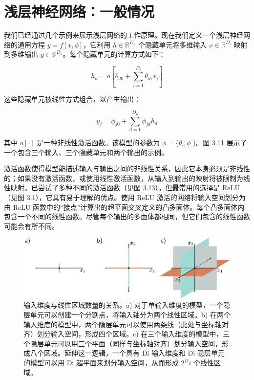 \section{浅层神经网络：一般情况}

我们已经通过几个示例来展示浅层网络的工作原理。现在我们定义一个浅层神经网络的通用方程 \( y = f[x, \phi] \)，它利用 \( h \in \mathbb{R}^{D_h} \) 个隐藏单元将多维输入 \( x \in \mathbb{R}^{D_i} \) 映射到多维输出 \( y \in \mathbb{R}^{D_o} \)。每个隐藏单元的计算方式如下：

\begin{equation}
h_d = a \left[ \theta_{d0} + \sum_{i=1}^{D_i} \theta_{di}x_i \right] 
\end{equation}


这些隐藏单元被线性方式组合，以产生输出：

\begin{equation}
y_j = \phi_{j0} + \sum_{d=1}^{D_h} \phi_{jd}h_d 
\end{equation}

其中 \(a[\cdot]\)  是一种非线性激活函数。该模型的参数为 \(\phi = \{ \theta_{\cdot}, \phi_{\cdot}\}\)。图 3.11 展示了一个包含三个输入、三个隐藏单元和两个输出的示例。

激活函数使得模型能描述输入与输出之间的非线性关系，因此它本身必须是非线性的；如果没有激活函数，或使用线性激活函数，从输入到输出的映射将被限制为线性映射。已尝试了多种不同的激活函数（见图 3.13），但最常用的选择是 ReLU（见图 3.1），它具有易于理解的优点。使用 ReLU 激活的网络将输入空间划分为由 ReLU 函数中的“接点”计算出的超平面交叉定义的凸多面体。每个凸多面体内包含一个不同的线性函数。尽管每个输出的多面体都相同，但它们包含的线性函数可能会有所不同。

\begin{figure}[ht!]
	\centering
	\includegraphics[width=0.7\linewidth]{png/chapter3/ShallowHyperplanes.png}
\caption{输入维度与线性区域数量的关系。a) 对于单输入维度的模型，一个隐层单元可以创建一个分割点，将输入轴分为两个线性区域。b) 在两个输入维度的模型中，两个隐层单元可以使用两条线（此处与坐标轴对齐）划分输入空间，形成四个区域。c) 在三个输入维度的模型中，三个隐层单元可以用三个平面（同样与坐标轴对齐）划分输入空间，形成八个区域。延伸这一逻辑，一个具有 Di 输入维度和 Di 隐层单元的模型可以用 Di 超平面来划分输入空间，从而形成 $2^Di$ 个线性区域。}
\end{figure}

